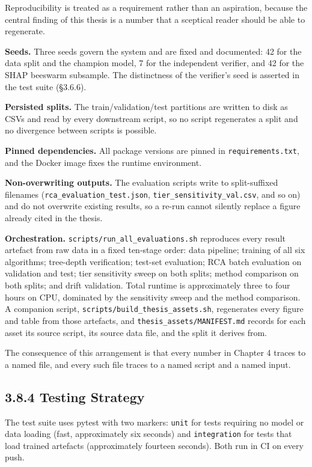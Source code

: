 Reproducibility is treated as a requirement rather than an aspiration, because the central finding of this thesis is a number that a sceptical reader should be able to regenerate.

\textbf{Seeds.} Three seeds govern the system and are fixed and documented: 42 for the data split and the champion model, 7 for the independent verifier, and 42 for the SHAP beeswarm subsample. The distinctness of the verifier's seed is asserted in the test suite (§3.6.6).

\textbf{Persisted splits.} The train/validation/test partitions are written to disk as CSVs and read by every downstream script, so no script regenerates a split and no divergence between scripts is possible.

\textbf{Pinned dependencies.} All package versions are pinned in \texttt{requirements.txt}, and the Docker image fixes the runtime environment.

\textbf{Non-overwriting outputs.} The evaluation scripts write to split-suffixed filenames (\texttt{rca\_evaluation\_test.json}, \texttt{tier\_sensitivity\_val.csv}, and so on) and do not overwrite existing results, so a re-run cannot silently replace a figure already cited in the thesis.

\textbf{Orchestration.} \texttt{scripts/run\_all\_evaluations.sh} reproduces every result artefact from raw data in a fixed ten-stage order: data pipeline; training of all six algorithms; tree-depth verification; test-set evaluation; RCA batch evaluation on validation and test; tier sensitivity sweep on both splits; method comparison on both splits; and drift validation. Total runtime is approximately three to four hours on CPU, dominated by the sensitivity sweep and the method comparison. A companion script, \texttt{scripts/build\_thesis\_assets.sh}, regenerates every figure and table from those artefacts, and \texttt{thesis\_assets/MANIFEST.md} records for each asset its source script, its source data file, and the split it derives from.

The consequence of this arrangement is that every number in Chapter 4 traces to a named file, and every such file traces to a named script and a named input.

\hypertarget{testing-strategy}{%
\subsection{3.8.4 Testing Strategy}\label{testing-strategy}}

The test suite uses pytest with two markers: \texttt{unit} for tests requiring no model or data loading (fast, approximately six seconds) and \texttt{integration} for tests that load trained artefacts (approximately fourteen seconds). Both run in CI on every push.

